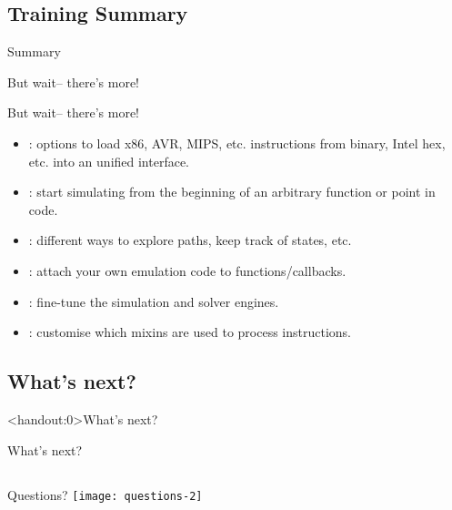 \documentclass[xcolor={dvipsnames}]{beamer}
\begin{document}
\subsection{Training Summary}
\begin{frame}{Summary}
\end{frame}
\begin{frame}{But wait-- there's more!}
\end{frame}
\begin{frame}[fragile]{But wait-- there's more!}
    \small
    \begin{itemize}
        \item {}: options to load x86, AVR, MIPS, etc. instructions from binary, Intel hex, etc. into an unified interface.
        \item {}: start simulating from the beginning of an arbitrary function or point in code.
        \item {}: different ways to explore paths, keep track of states, etc.
        \item {}: attach your own emulation code to functions/callbacks.
        \item {}: fine-tune the simulation and solver engines.
        \item {}: customise which mixins are used to process instructions.
    \end{itemize}
\end{frame}


\subsection{What's next?}
\begin{frame}<handout:0>{What's next?}
\end{frame}
\begin{frame}[noframenumbering]{What's next?}
\end{frame}

\subsection{}
\begin{frame}{Questions?}
    \centering
    \texttt{[image: questions-2]}
\end{frame}
\end{document}
